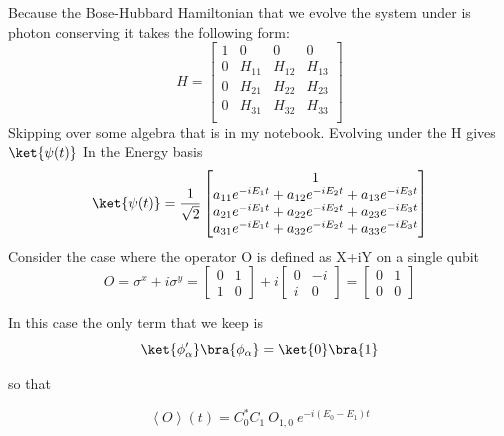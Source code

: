 Because the Bose-Hubbard Hamiltonian that we evolve the system under is photon conserving it takes the following form:
\begin{equation}
H=
\begin{bmatrix}
1 & 0 & 0 & 0 \\
0 & H_{11} & H_{12} & H_{13} \\
0 & H_{21} & H_{22} & H_{23} \\
0 & H_{31} & H_{32} & H_{33} \\
\end{bmatrix}
\end{equation}
Skipping over some algebra that is in my notebook.
Evolving under the H gives $\ket{\psi(t)}$
In the Energy basis
\begin{equation}
\ket{\psi (t)} = \frac{1}{\sqrt{2}}
\begin{bmatrix}
1 \\
a_{11} e^{-i E_1 t} + a_{12} e^{-i E_2 t} + a_{13} e^{-i E_3 t} \\
a_{21} e^{-i E_1 t} + a_{22} e^{-i E_2 t} + a_{23} e^{-i E_3 t} \\
a_{31} e^{-i E_1 t} + a_{32} e^{-i E_2 t} + a_{33} e^{-i E_3 t}
\end{bmatrix}
\end{equation}
Consider the case where the operator O is defined as X+iY on a single qubit
\begin{equation}
    O = \sigma^{x} + i \sigma^{y} =
    \begin{bmatrix}
        0 & 1 \\
        1 & 0
    \end{bmatrix}
    +
    i
    \begin{bmatrix}
        0 & -i \\
        i & 0
    \end{bmatrix}
    =
    \begin{bmatrix}
        0 & 1 \\
        0 & 0
    \end{bmatrix}
\end{equation}

In this case the only term that we keep is
\begin{equation}
    \ket{\phi_{\alpha}^{\prime}}
    \bra{\phi_{\alpha}}=
    \ket{0}
    \bra{1}
\end{equation}

so that

\begin{equation}
    \left< O \right>(t) = C^{*}_{0}C_{1} \: O_{1,0} \: e^{- i(E_{0} - E_{1} )t}
\end{equation}

